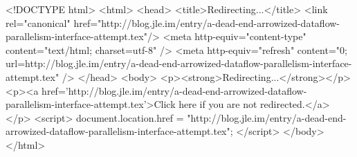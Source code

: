 <!DOCTYPE html>
<html>
<head>
<title>Redirecting...</title>
<link rel="canonical" href="http://blog.jle.im/entry/a-dead-end-arrowized-dataflow-parallelism-interface-attempt.tex"/>
<meta http-equiv="content-type" content="text/html; charset=utf-8" />
<meta http-equiv="refresh" content="0; url=http://blog.jle.im/entry/a-dead-end-arrowized-dataflow-parallelism-interface-attempt.tex" />
</head>
<body>
  <p><strong>Redirecting...</strong></p>
  <p><a href='http://blog.jle.im/entry/a-dead-end-arrowized-dataflow-parallelism-interface-attempt.tex'>Click here if you are not redirected.</a></p>
  <script>
    document.location.href = "http://blog.jle.im/entry/a-dead-end-arrowized-dataflow-parallelism-interface-attempt.tex";
  </script>
</body>
</html>
